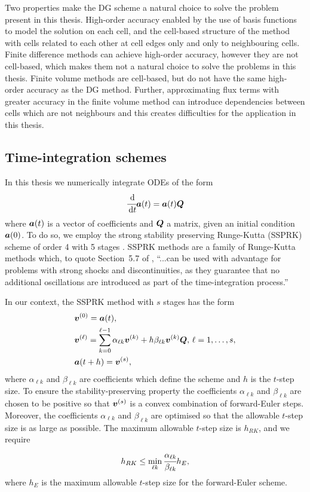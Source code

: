 Two properties make the DG scheme a natural choice to solve the problem present in this thesis. High-order accuracy enabled by the use of basis functions to model the solution on each cell, and the cell-based structure of the method with cells related to each other at cell edges only and only to neighbouring cells. Finite difference methods can achieve high-order accuracy, however they are not cell-based, which makes them not a natural choice to solve the problems in this thesis. Finite volume methods are cell-based, but do not have the same high-order accuracy as the DG method. Further, approximating flux terms with greater accuracy in the finite volume method can introduce dependencies between cells which are not neighbours and this creates difficulties for the application in this thesis. 

\subsection{Time-integration schemes}\label{sec: time integration}
In this thesis we numerically integrate ODEs of the form
\begin{align}\label{eqn: DG ODE w BCs 3}
	\cfrac{\, \mathrm{d}}{\, \mathrm{d} t} \boldsymbol a(t)
	= \boldsymbol a(t) \boldsymbol Q
\end{align}
where \(\boldsymbol a(t)\) is a vector of coefficients and \(\boldsymbol Q\) a matrix, given an initial condition \(\boldsymbol a(0)\). To do so, we employ the strong stability preserving Runge-Kutta (SSPRK) scheme of order 4 with 5 stages \citep{sr2002}. SSPRK methods are a family of Runge-Kutta methods which, to quote Section~5.7 of \cite{nodalDGBook}, ``...can be used with advantage for problems with strong shocks and discontinuities, as they guarantee that no additional oscillations are introduced as part of the time-integration process.'' 

In our context, the SSPRK method with \(s\) stages has the form 
\begin{align*}
	&\boldsymbol v^{(0)} = \boldsymbol a(t),\\
	&\boldsymbol v^{(\ell)} = \sum_{k=0}^{\ell-1} \alpha_{\ell k}\boldsymbol v^{(k)} + h\beta_{\ell k}  \boldsymbol v^{(k)}\boldsymbol Q,\, \ell = 1,\dots,s,\\
	&\boldsymbol a(t+h) =\boldsymbol v^{(s)},
\end{align*}
where \(\alpha_{\ell k}\) and \(\beta_{\ell k}\) are coefficients which define the scheme and \(h\) is the \(t\)-step size. To ensure the stability-preserving property the coefficients \(\alpha_{\ell k}\) and \(\beta_{\ell k}\) are chosen to be positive so that \(\boldsymbol v^{(s)}\) is a convex combination of forward-Euler steps. Moreover, the coefficients \(\alpha_{\ell k}\) and \(\beta_{\ell k}\) are optimised so that the allowable \(t\)-step size is as large as possible. The maximum allowable \(t\)-step size is \(h_{RK}\), and we require 
\[h_{RK} \leq \min_{\ell k}\cfrac{\alpha_{\ell k}}{\beta_{\ell k}}h_E,\]
where \(h_E\) is the maximum allowable \(t\)-step size for the forward-Euler scheme. 

